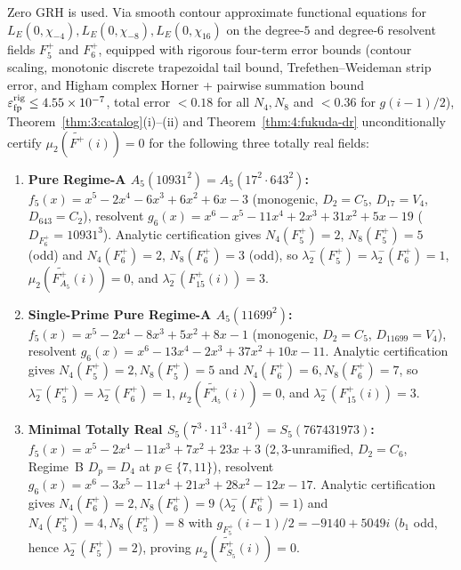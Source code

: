 \begin{theorem}\label{thm:4:a5-s5-cert}
\tagProved{}
Zero GRH is used. Via smooth contour approximate functional equations for $L_E(0, \chi_{-4}), L_E(0, \chi_{-8}), L_E(0, \chi_{16})$ on the degree-$5$ and degree-$6$ resolvent fields $F_5^+$ and $F_6^+$, equipped with rigorous four-term error bounds (contour scaling, monotonic discrete trapezoidal tail bound, Trefethen--Weideman strip error, and Higham complex Horner + pairwise summation bound $\varepsilon_{\mathrm{fp}}^{\mathrm{rig}} \le 4.55\times 10^{-7}$, total error $< 0.18$ for all $N_4, N_8$ and $< 0.36$ for $g(i-1)/2$), Theorem~\ref{thm:3:catalog}(i)--(ii) and Theorem~\ref{thm:4:fukuda-dr} unconditionally certify $\mu_2(\widetilde{F^+}(i)) = 0$ for the following three totally real fields:
\begin{enumerate}[label=\textup{(\arabic*)}]
\item \textbf{Pure Regime-A $A_5(10931^2) = A_5(17^2 \cdot 643^2)$:} $f_5(x) = x^5 - 2x^4 - 6x^3 + 6x^2 + 6x - 3$ (monogenic, $D_2 = C_5$, $D_{17} = V_4$, $D_{643} = C_2$), resolvent $g_6(x) = x^6 - x^5 - 11x^4 + 2x^3 + 31x^2 + 5x - 19$ ($D_{F_6^+} = 10931^3$). Analytic certification gives $N_4(F_5^+) = 2$, $N_8(F_5^+) = 5$ (odd) and $N_4(F_6^+) = 2$, $N_8(F_6^+) = 3$ (odd), so $\lambda_2^-(F_5^+) = \lambda_2^-(F_6^+) = 1$, $\mu_2(\widetilde{F_{A_5}^+}(i)) = 0$, and $\lambda_2^-(F_{15}^+(i)) = 3$.
\item \textbf{Single-Prime Pure Regime-A $A_5(11699^2)$:} $f_5(x) = x^5 - 2x^4 - 8x^3 + 5x^2 + 8x - 1$ (monogenic, $D_2 = C_5$, $D_{11699} = V_4$), resolvent $g_6(x) = x^6 - 13x^4 - 2x^3 + 37x^2 + 10x - 11$. Analytic certification gives $N_4(F_5^+) = 2, N_8(F_5^+) = 5$ and $N_4(F_6^+) = 6, N_8(F_6^+) = 7$, so $\lambda_2^-(F_5^+) = \lambda_2^-(F_6^+) = 1$, $\mu_2(\widetilde{F_{A_5}^+}(i)) = 0$, and $\lambda_2^-(F_{15}^+(i)) = 3$.
\item \textbf{Minimal Totally Real $S_5(7^3 \cdot 11^3 \cdot 41^2) = S_5(767431973)$:} $f_5(x) = x^5 - 2x^4 - 11x^3 + 7x^2 + 23x + 3$ ($2,3$-unramified, $D_2 = C_6$, Regime~B $D_p = D_4$ at $p \in \{7, 11\}$), resolvent $g_6(x) = x^6 - 3x^5 - 11x^4 + 21x^3 + 28x^2 - 12x - 17$. Analytic certification gives $N_4(F_6^+) = 2, N_8(F_6^+) = 9$ ($\lambda_2^-(F_6^+) = 1$) and $N_4(F_5^+) = 4, N_8(F_5^+) = 8$ with $g_{F_5^+}(i-1)/2 = -9140 + 5049i$ ($b_1$ odd, hence $\lambda_2^-(F_5^+) = 2$), proving $\mu_2(\widetilde{F_{S_5}^+}(i)) = 0$.
\end{enumerate}
\end{theorem}

